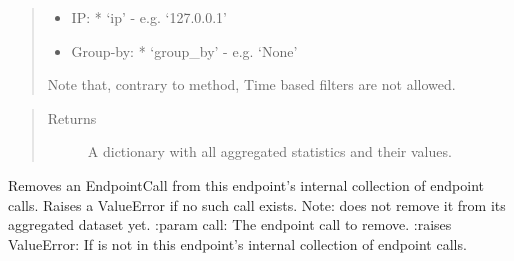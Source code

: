 \documentclass[letterpaper,10pt,english]{sphinxmanual}
\begin{document}
\begin{fulllineitems}
\begin{fulllineitems}
\begin{quote}
\begin{description}
\begin{itemize}
\item {} 
IP:
* ‘ip’ - e.g. ‘127.0.0.1’

\item {} 
Group-by:
* ‘group\_by’ - e.g. ‘None’

\end{itemize}

Note that, contrary to  method, Time based filters are not allowed.

\end{description}
\end{quote}
\begin{quote}\begin{description}
\item[{Returns}] \leavevmode
A dictionary with all aggregated statistics and their values.

\end{description}\end{quote}

\end{fulllineitems}


\begin{fulllineitems}
\label{\detokenize{pydash_app.dashboard.endpoint:pydash_app.dashboard.endpoint.Endpoint.get_id}}
\end{fulllineitems}


\begin{fulllineitems}
\label{\detokenize{pydash_app.dashboard.endpoint:pydash_app.dashboard.endpoint.Endpoint.remove_endpoint_call}}
Removes an EndpointCall from this endpoint’s internal collection of endpoint calls.
Raises a ValueError if no such call exists.
Note: does not remove it from its aggregated dataset yet.
:param call: The endpoint call to remove.
:raises ValueError: If  is not in this endpoint’s internal collection of endpoint calls.

\end{fulllineitems}


\begin{fulllineitems}
\label{\detokenize{pydash_app.dashboard.endpoint:pydash_app.dashboard.endpoint.Endpoint.set_monitored}}
\end{fulllineitems}


\end{fulllineitems}
\end{document}
